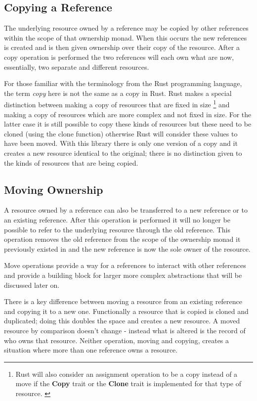 \documentclass[onehalf,11pt]{beavtex}
\begin{document}
\subsection{Copying a Reference}

The underlying resource owned by a reference may be copied by other references
within the scope of that ownership monad.  When this occurs the new references is
created and is then given ownership over their copy of the resource.  After a
copy operation is performed the two references will each own what are now,
essentially, two separate and different resources.

For those familiar with the terminology from the Rust programming language, the
term \textit{copy} here is not the same as a copy in Rust. Rust makes a special
distinction between making a copy of resources that are fixed in size
\footnote{Rust will also consider an assignment operation to be a copy instead
  of a move if the \textbf{Copy} trait or the \textbf{Clone} trait is
  implemented for that type of resource. \cite{rust_book_traits}
  \cite{rust_docs_clone_trait}}
and making a copy of resources which are more complex and not fixed in size.
For the latter case it is still possible to copy these kinds of resources but these
need to be cloned (using the clone function) otherwise Rust will consider these
values to have been moved. \cite{rust_book_ownership}
With this library there is only one version of a copy and it creates a new
resource identical to the original; there is no distinction given to the kinds
of resources that are being copied.

\subsection{Moving Ownership}

A resource owned by a reference can also be transferred to a new reference or
to an existing reference. After this operation is performed it will no longer
be possible to refer to the underlying resource through the old reference. This
operation removes the old reference from the scope of the ownership monad it
previously existed in and the new reference is now the sole owner of the
resource.

Move operations provide a way for a references to interact with
other references and provide a building block for larger more complex
abstractions that will be discussed later on.

There is a key difference between moving a resource from an existing reference
and copying it to a new one.  Functionally a resource that is copied is cloned
and duplicated; doing this doubles the space and creates a new resource.
A moved resource by comparison doesn't change - instead what is altered is the
record of who owns that resource.  Neither operation, moving and copying,
creates a situation where more than one reference owns a resource.
\end{document}
